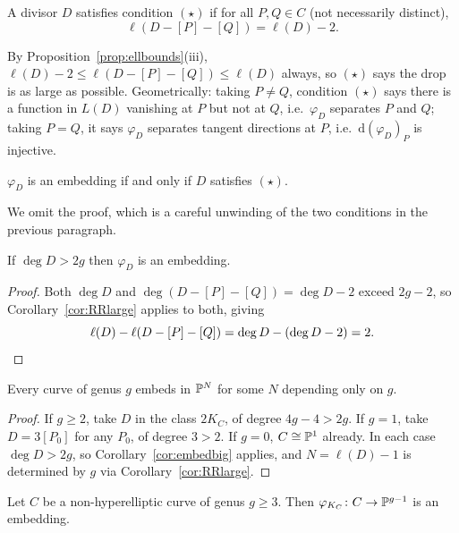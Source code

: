 \documentclass[a4paper]{scrartcl}
\newcommand{\dee}{\mathrm{d}}
\begin{document}
\begin{definition}
	A divisor $D$ satisfies condition $(\star)$ if for all $P,Q \in C$ (not necessarily distinct),
	$$\ell(D - [P] - [Q]) = \ell(D) - 2.$$
\end{definition}

By Proposition~\ref{prop:ellbounds}(iii), $\ell(D)-2 \leq \ell(D-[P]-[Q]) \leq \ell(D)$ always, so $(\star)$ says the drop is as large as possible. Geometrically: taking $P \neq Q$, condition $(\star)$ says there is a function in $L(D)$ vanishing at $P$ but not at $Q$, i.e.\ $\varphi_D$ separates $P$ and $Q$; taking $P = Q$, it says $\varphi_D$ separates tangent directions at $P$, i.e.\ $\dee(\varphi_D)_P$ is injective.

\begin{theorem}\label{thm:embedding}
	$\varphi_D$ is an embedding if and only if $D$ satisfies $(\star)$.
\end{theorem}

We omit the proof, which is a careful unwinding of the two conditions in the previous paragraph.

\begin{corollary}\label{cor:embedbig}
	If $\deg D > 2g$ then $\varphi_D$ is an embedding.
\end{corollary}

\begin{proof}
	Both $\deg D$ and $\deg(D-[P]-[Q]) = \deg D - 2$ exceed $2g-2$, so Corollary~\ref{cor:RRlarge} applies to both, giving
	$$\ell(D) - \ell(D-[P]-[Q]) = \deg D - (\deg D - 2) = 2. \qedhere$$
\end{proof}

\begin{corollary}
	Every curve of genus $g$ embeds in $\mathbb{P}^N$ for some $N$ depending only on $g$.
\end{corollary}

\begin{proof}
	If $g \geq 2$, take $D$ in the class $2K_C$, of degree $4g-4 > 2g$. If $g = 1$, take $D = 3[P_0]$ for any $P_0$, of degree $3 > 2$. If $g = 0$, $C \cong \mathbb{P}^1$ already. In each case $\deg D > 2g$, so Corollary~\ref{cor:embedbig} applies, and $N = \ell(D)-1$ is determined by $g$ via Corollary~\ref{cor:RRlarge}.
\end{proof}

\begin{theorem}
	Let $C$ be a non-hyperelliptic curve of genus $g \geq 3$. Then $\varphi_{K_C} \colon C \to \mathbb{P}^{g-1}$ is an embedding.
\end{theorem}
\end{document}

